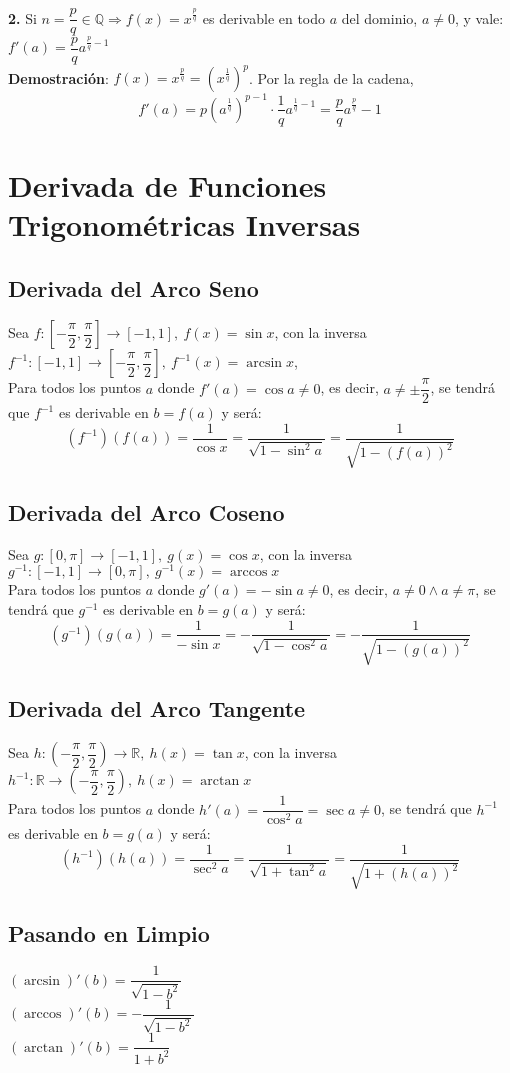 \documentclass[11pt,a4paper]{article}
\begin{document}
\textbf{2.} Si $n=\dfrac{p}{q} \in \mathbb{Q} \Rightarrow f(x)=x^{\frac{p}{q}}$ es derivable en todo $a$ del dominio, $a\not=0$, y vale: $f'(a) = \dfrac{p}{q}a^{\frac{p}{q}-1}$\\
\textbf{Demostraci\'on}: $f(x)=x^\frac{p}{q}=(x^\frac{1}{q})^p$. Por la regla de la cadena, $$f'(a) = p(a^\frac{1}{q})^{p-1} \cdot \dfrac{1}{q}a^{\frac{1}{q}-1} = \dfrac{p}{q}a^\frac{p}{q}-1$$

\section{Derivada de Funciones Trigonom\'etricas Inversas}
\subsection{Derivada del Arco Seno}
Sea $f:[-\dfrac{\pi}{2}, \dfrac{\pi}{2}] \rightarrow [-1,1],\ f(x)=\sin x$, con la inversa $f^{-1}:[-1,1] \rightarrow [-\dfrac{\pi}{2}, \dfrac{\pi}{2}],\ f^{-1}(x) = \arcsin x$,\\
Para todos los puntos $a$ donde $f'(a) = \cos a\not=0$, es decir, $a\not=\pm\dfrac{\pi}{2}$, se tendr\'a que $f^{-1}$ es derivable en $b=f(a)$ y ser\'a: $$(f^{-1})(f(a)) = \dfrac{1}{\cos x} = \dfrac{1}{\sqrt{1 - \sin^2 a}} = \dfrac{1}{\sqrt{1-(f(a))^2}} $$

\subsection{Derivada del Arco Coseno}
Sea $g:[0,\pi]\rightarrow[-1,1],\ g(x)=\cos x$, con la inversa $g^{-1}:[-1,1]\rightarrow[0,\pi],\ g^{-1}(x)=\arccos x$\\
Para todos los puntos $a$ donde $g'(a) = -\sin a\not=0$, es decir, $a\not=0 \land a\not=\pi$, se tendr\'a que $g^{-1}$ es derivable en $b=g(a)$ y ser\'a: $$(g^{-1})(g(a)) = \dfrac{1}{-\sin x} = -\dfrac{1}{\sqrt{1 - \cos^2 a}} = -\dfrac{1}{\sqrt{1-(g(a))^2}} $$

\subsection{Derivada del Arco Tangente}
Sea $h: (-\dfrac{\pi}{2},\dfrac{\pi}{2})\rightarrow\mathbb{R},\ h(x)=\tan x$, con la inversa $h^{-1}:\mathbb{R}\rightarrow(-\dfrac{\pi}{2},\dfrac{\pi}{2}),\ h(x)=\arctan x$\\
Para todos los puntos $a$ donde $h'(a) = \dfrac{1}{\cos^2a}=\sec a\not=0$, se tendr\'a que $h^{-1}$ es derivable en $b=g(a)$ y ser\'a: $$(h^{-1})(h(a)) = \dfrac{1}{\sec^2 a} = \dfrac{1}{\sqrt{1 + \tan^2 a}} = \dfrac{1}{\sqrt{1 + (h(a))^2}} $$

\subsection{Pasando en Limpio}
\begin{multicols}{3}
$(\arcsin)'(b) = \dfrac{1}{\sqrt{1 - b^2}}$\\
$(\arccos)'(b) = -\dfrac{1}{\sqrt{1 - b^2}}$\\
$(\arctan)'(b) = \dfrac{1}{1 + b^2}$\\
\end{multicols}
\end{document}
